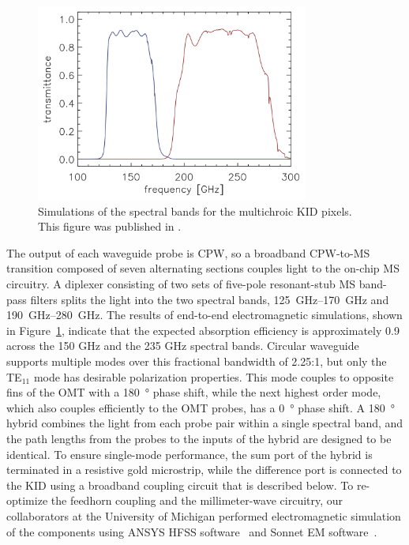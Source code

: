 \begin{figure}[htb]
\centering
\includegraphics[width=0.8\textwidth]{multichroic/multichroic_spectral_bands.png}
\caption[Simulations of the spectral bands for the multichroic KID pixels.]
{
Simulations of the spectral bands for the multichroic KID pixels.
This figure was published in \textcite{Johnson2016SPIE}.
}
\label{fig:multichroic_spectral_bands}
\end{figure}

The output of each waveguide probe is CPW, so a broadband CPW-to-MS transition composed of seven alternating sections couples light to the on-chip MS circuitry.
A diplexer consisting of two sets of five-pole resonant-stub MS band-pass filters splits the light into the two spectral bands, \SIrange{125}{170}{GHz} and \SIrange{190}{280}{GHz}.
The results of end-to-end electromagnetic simulations, shown in 
Figure~\ref{fig:multichroic_spectral_bands}, indicate that the expected absorption efficiency is approximately 0.9 across the 150 GHz and the 235 GHz spectral bands.
Circular waveguide supports multiple modes over this fractional bandwidth of 2.25:1, but only the TE$_{11}$ mode has desirable polarization properties.
This mode couples to opposite fins of the OMT with a \SI{180}{\degree} phase shift, while the next highest order mode, which also couples efficiently to the OMT probes, has a \SI{0}{\degree} phase shift.
A \SI{180}{\degree} hybrid combines the light from each probe pair within a single spectral band, and the path lengths from the probes to the inputs of the hybrid are designed to be identical.
To ensure single-mode performance, the sum port of the hybrid is terminated in a resistive gold microstrip, while the difference port is connected to the KID using a broadband coupling circuit that is described below.
To re-optimize the feedhorn coupling and the millimeter-wave circuitry, our collaborators at the University of Michigan performed electromagnetic simulation of the components using ANSYS HFSS software~\autocite{HFSS} and Sonnet EM software~\autocite{Sonnet}. %

